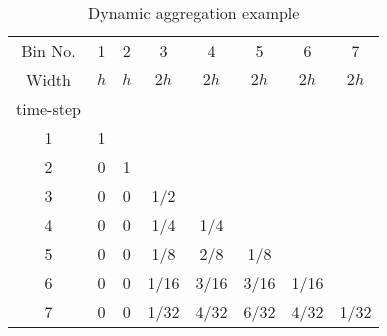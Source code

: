 \documentclass[review,12pt]{elsarticle}
\begin{document}
\begin{table}[htbp!]
\centering
\caption{Dynamic aggregation example}
\label{tab:dynamic example}
\begin{tabular}{cccccccc}
Bin No.                 & 1                      & 2                      & 3                         & 4                         & 5                         & 6                         & 7                         \\
Width                   & $h$                      & $h$                      & $2h$                        & $2h$                        & $2h$                   & $2h$                        & $2h$                        \\
time-step                &                        &                        &                           &                           &                           &                           &                           \\ \cline{1-2}
\multicolumn{1}{|c|}{1} & \multicolumn{1}{c|}{1} &                        &                           &                           &                           &                           &                           \\ \cline{1-3}
\multicolumn{1}{|c|}{2} & \multicolumn{1}{c|}{0} & \multicolumn{1}{c|}{1} &                           &                           &                           &                           &                           \\ \cline{1-4}
\multicolumn{1}{|c|}{3} & \multicolumn{1}{c|}{0} & \multicolumn{1}{c|}{0} & \multicolumn{1}{c|}{1/2}  &                           &                           &                           &                           \\ \cline{1-5}
\multicolumn{1}{|c|}{4} & \multicolumn{1}{c|}{0} & \multicolumn{1}{c|}{0} & \multicolumn{1}{c|}{1/4}  & \multicolumn{1}{c|}{1/4}  &                           &                           &                           \\ \cline{1-6}
\multicolumn{1}{|c|}{5} & \multicolumn{1}{c|}{0} & \multicolumn{1}{c|}{0} & \multicolumn{1}{c|}{1/8}  & \multicolumn{1}{c|}{2/8}  & \multicolumn{1}{c|}{1/8}  &                           &                           \\ \cline{1-7}
\multicolumn{1}{|c|}{6} & \multicolumn{1}{c|}{0} & \multicolumn{1}{c|}{0} & \multicolumn{1}{c|}{1/16} & \multicolumn{1}{c|}{3/16} & \multicolumn{1}{c|}{3/16} & \multicolumn{1}{c|}{1/16} &                           \\ \hline
\multicolumn{1}{|c|}{7} & \multicolumn{1}{c|}{0} & \multicolumn{1}{c|}{0} & \multicolumn{1}{c|}{1/32} & \multicolumn{1}{c|}{4/32} & \multicolumn{1}{c|}{6/32} & \multicolumn{1}{c|}{4/32} & \multicolumn{1}{c|}{1/32} \\ \hline
\end{tabular}
\end{table}
\end{document}
